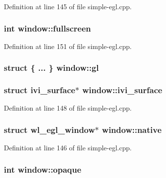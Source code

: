 Definition at line 145 of file simple-\/egl.\+cpp.

\subsubsection[{\texorpdfstring{fullscreen}{fullscreen}}]{\setlength{\rightskip}{0pt plus 5cm}int window\+::fullscreen}\hypertarget{structwindow_a8da44798a9e1feb7ed3fbd18ec3a28b6}{}\label{structwindow_a8da44798a9e1feb7ed3fbd18ec3a28b6}


Definition at line 151 of file simple-\/egl.\+cpp.

\subsubsection[{\texorpdfstring{gl}{gl}}]{\setlength{\rightskip}{0pt plus 5cm}struct \{ ... \}   window\+::gl}\hypertarget{structwindow_a6975a930e9a3c166f8201fc4ef5e7728}{}\label{structwindow_a6975a930e9a3c166f8201fc4ef5e7728}
\subsubsection[{\texorpdfstring{ivi\+\_\+surface}{ivi_surface}}]{\setlength{\rightskip}{0pt plus 5cm}struct ivi\+\_\+surface$\ast$ window\+::ivi\+\_\+surface}\hypertarget{structwindow_a40e2c6fb4178953c820fc1b9f41d4b31}{}\label{structwindow_a40e2c6fb4178953c820fc1b9f41d4b31}


Definition at line 148 of file simple-\/egl.\+cpp.

\subsubsection[{\texorpdfstring{native}{native}}]{\setlength{\rightskip}{0pt plus 5cm}struct wl\+\_\+egl\+\_\+window$\ast$ window\+::native}\hypertarget{structwindow_ae41be0955d0e73530e1bc13dfeb9d731}{}\label{structwindow_ae41be0955d0e73530e1bc13dfeb9d731}


Definition at line 146 of file simple-\/egl.\+cpp.

\subsubsection[{\texorpdfstring{opaque}{opaque}}]{\setlength{\rightskip}{0pt plus 5cm}int window\+::opaque}\hypertarget{structwindow_a026a50808d8323a5a73d585c19916fa8}{}\label{structwindow_a026a50808d8323a5a73d585c19916fa8}


